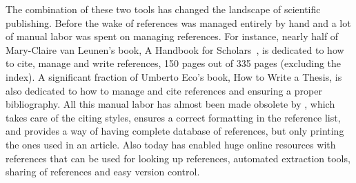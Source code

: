 The combination of these two tools has changed the landscape of
scientific publishing.  Before the wake of {\bibtex} references was
managed entirely by hand and a lot of manual labor was spent on
managing references.  For instance, nearly half of Mary-Claire van
Leunen's book, A Handbook for Scholars~\cite{leunen1992_handbook}, is
dedicated to how to cite, manage and write references, 150 pages out
of 335 pages (excluding the index).  A significant fraction of Umberto
Eco's book, How to Write a Thesis, is also dedicated to how to manage
and cite references and ensuring a proper bibliography.  All this
manual labor has almost been made obsolete by {\bibtex}, which takes
care of the citing styles, ensures a correct formatting in the
reference list, and provides a way of having complete database of
references, but only printing the ones used in an article.  Also today
{\bibtex} has enabled huge online resources with references that can
be used for looking up references, automated extraction tools, sharing
of references and easy version control.


%
%
